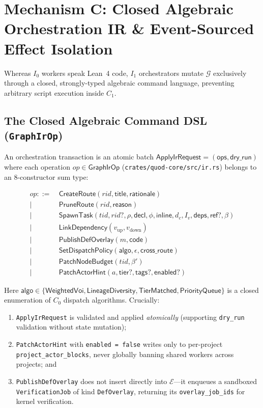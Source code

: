 \documentclass[sigplan,nonacm,10pt]{acmart}
\newcommand{\Truth}{\mathcal{E}}
\newcommand{\Orch}{\mathcal{G}}
\newcommand{\kw}[1]{\mathsf{#1}}
\newcommand{\code}[1]{\texttt{#1}}
\begin{document}
\section{Mechanism C: Closed Algebraic Orchestration IR \& Event-Sourced Effect Isolation}\label{sec:mech-c}

Whereas $I_0$ workers speak Lean~4 code, $I_1$ orchestrators mutate $\Orch$ exclusively through a closed, strongly-typed algebraic command language, preventing arbitrary script execution inside $C_1$.

\subsection{The Closed Algebraic Command DSL (\code{GraphIrOp})}
An orchestration transaction is an atomic batch $\kw{ApplyIrRequest} = (\kw{ops}, \kw{dry\_run})$ where each operation $op \in \kw{GraphIrOp}$ (\code{crates/\-quod-core/\-src/\-ir.rs}) belongs to an 8-constructor sum type:
\begin{small}
\begin{align*}
op ::= &\ \kw{CreateRoute}(rid, \kw{title}, \kw{rationale}) \\
\mid &\ \kw{PruneRoute}(rid, \kw{reason}) \\
\mid &\ \kw{SpawnTask}(tid, rid?, \rho, \kw{decl}, \phi, \kw{inline}, d_c, I_v, \kw{deps}, \kw{ref}?, \beta) \\
\mid &\ \kw{LinkDependency}(v_{\mathrm{up}}, v_{\mathrm{down}}) \\
\mid &\ \kw{PublishDefOverlay}(m, \kw{code}) \\
\mid &\ \kw{SetDispatchPolicy}(\kw{algo}, \epsilon, \kw{cross\_route}) \\
\mid &\ \kw{PatchNodeBudget}(tid, \beta') \\
\mid &\ \kw{PatchActorHint}(a, \kw{tier}?, \kw{tags}?, \kw{enabled}?)
\end{align*}
\end{small}
Here $\kw{algo} \in \{\kw{WeightedVoi},\allowbreak \kw{LineageDiversity},\allowbreak \kw{TierMatched},\allowbreak \kw{PriorityQueue}\}$ is a closed enumeration of $C_0$ dispatch algorithms. Crucially:
\begin{enumerate}
  \item \code{ApplyIrRequest} is validated and applied \emph{atomically} (supporting \code{dry\_run} validation without state mutation);
  \item \code{PatchActorHint} with \code{enabled = false} writes only to per-project \code{project\_\-actor\_\-blocks}, never globally banning shared workers across projects; and
  \item \code{PublishDefOverlay} does not insert directly into $\Truth$---it enqueues a sandboxed \code{VerificationJob} of kind \code{DefOverlay}, returning its \code{overlay\_\-job\_\-ids} for kernel verification.
\end{enumerate}
\end{document}
